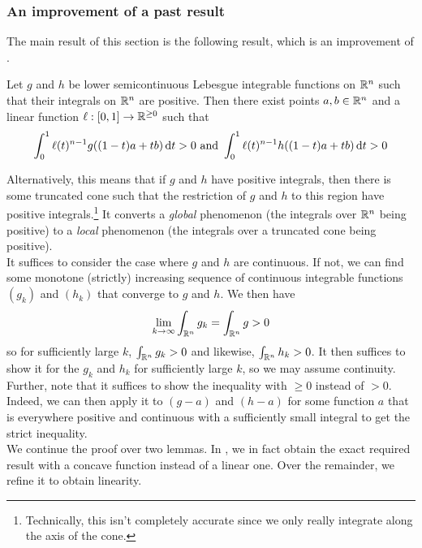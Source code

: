 \subsubsection{An improvement of a past result}

The main result of this section is the following result, which is an improvement of .

\begin{ftheo}
\label{localization lemma}
	Let $g$ and $h$ be lower semicontinuous Lebesgue integrable functions on $\mathbb{R}^n$ such that their integrals on $\mathbb{R}^n$ are positive. Then there exist points $a,b\in\mathbb{R}^n$ and a linear function $\ell:[0,1]\to\mathbb{R}^{\geq 0}$ such that
	\[ \int_0^1 \ell(t)^{n-1}g((1-t)a+tb)\operatorname{d}\!{t} > 0 \text{ and } \int_0^1 \ell(t)^{n-1}h((1-t)a+tb)\operatorname{d}\!{t} > 0 \]
\end{ftheo}

Alternatively, this means that if $g$ and $h$ have positive integrals, then there is some truncated cone such that the restriction of $g$ and $h$ to this region have positive integrals.\footnote{Technically, this isn't completely accurate since we only really integrate along the axis of the cone.} It converts a \textit{global} phenomenon (the integrals over $\mathbb{R}^n$ being positive) to a \textit{local} phenomenon (the integrals over a truncated cone being positive).\\

It suffices to consider the case where $g$ and $h$ are continuous. If not, we can find some monotone (strictly) increasing sequence of continuous integrable functions $(g_k)$ and $(h_k)$ that converge to $g$ and $h$. We then have
\[ \lim_{k\to\infty}\int_{\mathbb{R}^n} g_k = \int_{\mathbb{R}^n} g > 0 \]
so for sufficiently large $k$, $\int_{\mathbb{R}^n} g_k > 0$ and likewise, $\int_{\mathbb{R}^n} h_k > 0$. It then suffices to show it for the $g_k$ and $h_k$ for sufficiently large $k$, so we may assume continuity.\\
Further, note that it suffices to show the inequality with $\geq 0$ instead of $>0$. Indeed, we can then apply it to $(g-a)$ and $(h-a)$ for some function $a$ that is everywhere positive and continuous with a sufficiently small integral to get the strict inequality.\\

We continue the proof over two lemmas. In , we in fact obtain the exact required result with a concave function instead of a linear one. Over the remainder, we refine it to obtain linearity.

